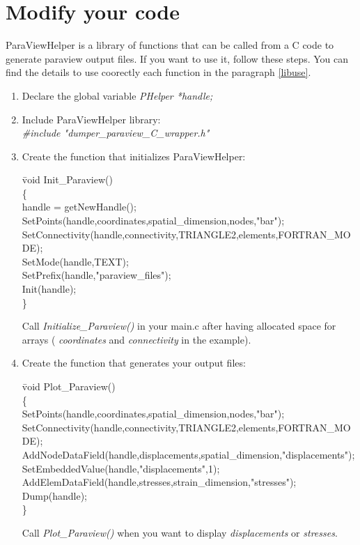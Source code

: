 \section{Modify your code}
ParaViewHelper is a library of functions that can be called from a C code to generate paraview output files. If you want to use it, follow these steps. You can find the details to use coorectly each function in the paragraph \ref{libuse}.
	\begin{enumerate}
	\item Declare the global variable \emph{PHelper *handle;}

	\item Include ParaViewHelper library: \\ \emph{\#include "dumper\_paraview\_C\_wrapper.h"} 

	\item Create the function that initializes ParaViewHelper: 
		\begin{tabbing}
		\hspace{15mm} \=void Init\_Paraview()\\
		\>\{\\
		\>handle = getNewHandle();\\
		\>SetPoints(handle,coordinates,spatial\_dimension,nodes,"bar");\\
		\>SetConnectivity(handle,connectivity,TRIANGLE2,elements,FORTRAN\_MODE);\\
		\>SetMode(handle,TEXT);\\
		\>SetPrefix(handle,"paraview\_files");\\
		\>Init(handle);\\
		\>\}
		\end{tabbing}

	Call \emph{Initialize\_Paraview()} in your main.c after having allocated space for arrays ( \emph{coordinates} and \emph{connectivity} in the example).

	\item Create the function that generates your output files:
		\begin{tabbing}
		\hspace{15mm} \=void Plot\_Paraview()\\
		\>\{\\
		\>SetPoints(handle,coordinates,spatial\_dimension,nodes,"bar");\\
		\>SetConnectivity(handle,connectivity,TRIANGLE2,elements,FORTRAN\_MODE);\\
		\>AddNodeDataField(handle,displacements,spatial\_dimension,"displacements");\\
		\>SetEmbeddedValue(handle,"displacements",1);\\
		\>AddElemDataField(handle,stresses,strain\_dimension,"stresses");\\
		\>Dump(handle);\\
		\>\}
		\end{tabbing}
	Call \emph{Plot\_Paraview()} when you want to display \emph{displacements} or \emph{stresses}.



\end{enumerate}
